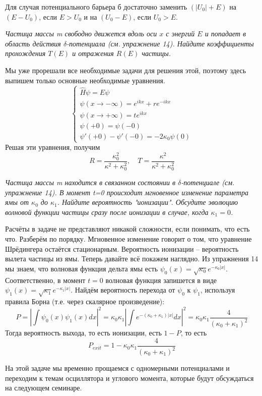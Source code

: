 Для случая потенциального барьера б достаточно заменить $(|U_0| + E)$ на $(E-U_0)$, если $E > U_0$ и на $(U_0 - E)$, если $U_0 > E$.
\begin{center}
    \textit{Частица массы m свободно движется вдоль оси $x$ с энергий $E$ и попадает в область действия $\delta$-потенциала (см. упражнение 14). Найдите коэффициенты прохождения $T(E)$ и отражения $R(E)$ частицы.}
\end{center}
Мы уже прорешали все необходимые задачи для решения этой, поэтому здесь выпишем только основные необходимые уравнения.
\[
\begin{cases}
\hat H \psi = E \psi \\
\psi(x\rightarrow -\infty) = e^{ikx} + re^{-ikx}\\
\psi(x\rightarrow +\infty) = te^{ikx}\\
\psi(+0) = \psi(-0)\\
\psi'(+0) - \psi'(-0) = -2\kappa_0\psi(0)
\end{cases}
\]
Решая эти уравнения, получим
\[
R = \frac{\kappa_0^2}{\kappa^2+\kappa^2_0}, \quad T = \frac{\kappa^2}{\kappa^2 + \kappa^2_0}
\]

\begin{center}
    \textit{Частица массы m находится в связанном состоянии в $\delta$-потенциале (см. упражнение 14). В момент t=0 происходит мгновенное изменение параметра ямы от $\kappa_0$ до $\kappa_1$. Найдите вероятность "ионизации". Обсудите эволюцию волновой функции частицы сразу после ионизации в случае, когда $\kappa_1=0$.}
\end{center}
Расчёты в задаче не представляют никакой сложности, если понимать, что есть что. Разберём по порядку. Мгновенное изменение говорит о том, что уравнение Шрёдингера остаётся стационарным. Вероятность ионизации – вероятность вылета частицы из ямы. Теперь давайте всё покажем наглядно. Из упражнения 14 мы знаем, что волновая функция дельта ямы есть $\psi_0(x) = \sqrt{\kappa_0}e^{-\kappa_0|x|}$. Соответственно, в момент $t=0$ волновая функция запишется в виде $\psi_1(x) = \sqrt{\kappa_1}e^{-\kappa_1 |x|}$. Найдём вероятность перехода от $\psi_0$ к $\psi_1$, используя правила Борна (т.е. через скалярное произведение):
\[
P = |\int\psi_0(x)\psi_1(x)dx|^2 =\kappa_0\kappa_1|\int e^{-(\kappa_0 + \kappa_1)|x|}dx|^2 = \kappa_0\kappa_1\frac{4}{(\kappa_0 + \kappa_1)^2}
\]
Тогда вероятность выхода, то есть ионизации, есть $1 - P$, то есть
\[
P_{exit} = 1 - \kappa_0\kappa_1\frac{4}{(\kappa_0 + \kappa_1)^2}
\]

На этой задаче мы временно прощаемся с одномерными потенциалами и переходим к темам осциллятора и углового момента, которые будут обсуждаться на следующем семинаре. 